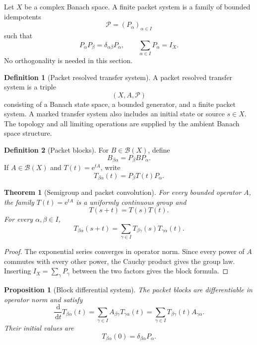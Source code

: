 \documentclass[11pt,letterpaper]{article}
\newtheorem{theorem}{Theorem}[section]
\theoremstyle{plain}
\newtheorem{proposition}[proposition]{Proposition}
\theoremstyle{plain}
\theoremstyle{plain}
\theoremstyle{definition}
\theoremstyle{definition}
\newtheorem{definition}[definition]{Definition}
\theoremstyle{definition}
\theoremstyle{definition}
\theoremstyle{definition}
\theoremstyle{remark}
\theoremstyle{remark}
\theoremstyle{remark}
\theoremstyle{remark}
\theoremstyle{remark}
\theoremstyle{remark}
\newcommand{\Pcal}{\mathcal P}
\newcommand{\e}{\mathrm e}
\newcommand{\dd}{\,\mathrm d}
\let\KomorebiPrimitiveMathcal\mathcal
\renewcommand{\mathcal}[1]{{\KomorebiPrimitiveMathcal{#1}}}
\let\KomorebiPrimitivemathrm\mathrm
\renewcommand{\mathrm}[1]{{\KomorebiPrimitivemathrm{#1}}}
\begin{document}
Let \(X\) be a complex Banach space. A finite packet system is a family of bounded idempotents
\[
\Pcal=(P_\alpha)_{\alpha\in I}
\]
such that
\[
P_\alpha P_\beta=\delta_{\alpha\beta}P_\alpha,
\qquad
\sum_{\alpha\in I}P_\alpha=I_X.
\]
No orthogonality is needed in this section.

\begin{definition}[Packet resolved transfer system]\label{extended:record:001}
A packet resolved transfer system is a triple
\[
(X,A,\Pcal)
\]
consisting of a Banach state space, a bounded generator, and a finite packet system. A marked transfer system also includes an initial state or source $s\in X$. The topology and all limiting operations are supplied by the ambient Banach space structure.
\end{definition}

\begin{definition}[Packet blocks]\label{extended:record:002}
For \(B\in\mathcal B(X)\), define
\[
B_{\beta\alpha}=P_\beta BP_\alpha.
\]
If \(A\in\mathcal B(X)\) and \(T(t)=\e^{tA}\), write
\[
T_{\beta\alpha}(t)=P_\beta T(t)P_\alpha.
\]
\end{definition}

\begin{theorem}[Semigroup and packet convolution]\label{extended:record:003}\label{extended:thm:packet_convolution}
For every bounded operator \(A\), the family \(T(t)=\e^{tA}\) is a uniformly continuous group and
\[
T(s+t)=T(s)T(t).
\]
For every \(\alpha,\beta\in I\),
\[
T_{\beta\alpha}(s+t)
=
\sum_{\gamma\in I}
T_{\beta\gamma}(s)T_{\gamma\alpha}(t).
\]
\end{theorem}

\begin{proof}
The exponential series converges in operator norm. Since every power of \(A\) commutes with every other power, the Cauchy product gives the group law. Inserting \(I_X=\sum_\gamma P_\gamma\) between the two factors gives the block formula.
\end{proof}

\begin{proposition}[Block differential system]\label{extended:record:004}\label{extended:prop:block_differential}
The packet blocks are differentiable in operator norm and satisfy
\[
\frac{\dd}{\dd t}T_{\beta\alpha}(t)
=
\sum_{\gamma\in I}
A_{\beta\gamma}T_{\gamma\alpha}(t)
=
\sum_{\gamma\in I}
T_{\beta\gamma}(t)A_{\gamma\alpha}.
\]
Their initial values are
\[
T_{\beta\alpha}(0)=\delta_{\beta\alpha}P_\alpha.
\]
\end{proposition}
\end{document}
